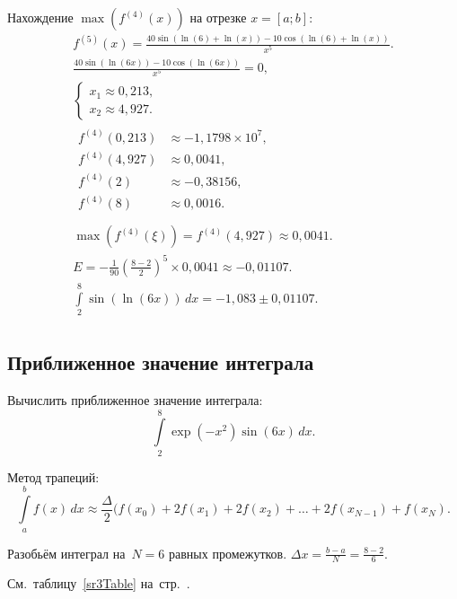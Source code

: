 \documentclass[10pt, a4paper, titlepage, oneside]{article}
\begin{document}
Нахождение $\max(f^{(4)}(x))$ на отрезке $x=[a; b]$:
\begin{gather*}
    f^{(5)}(x) = \frac{40\sin(\ln(6)+\ln(x))-10\cos(\ln(6)+\ln(x))}{x^5} .\\
    \frac{40\sin(\ln(6x))-10\cos(\ln(6x))}{x^5} = 0 ,\\
    \begin{cases}
        x_1\approx0,213 ,\\
        x_2\approx4,927 .
    \end{cases}
    \\
    \begin{aligned}
        f^{(4)}(0,213) &\approx -1,1798\times10^7 ,\\
        f^{(4)}(4,927) &\approx 0,0041 ,\\
        f^{(4)}(2) &\approx -0,38156 ,\\
        f^{(4)}(8) &\approx 0,0016 .\\
    \end{aligned}
    \\
    \max(f^{(4)}(\xi)) = f^{(4)}(4,927) \approx 0,0041 .\\
    E = -\frac{1}{90}\left(\frac{8-2}{2}\right)^5\times0,0041 \approx -0,01107 .\\
    \int\limits_2^{8} \sin(\ln(6x))\,dx = -1,083\pm0,01107 .\\
\end{gather*}


\subsection*{Приближенное значение интеграла}

Вычислить приближенное значение интеграла:
$$\int\limits_2^8 \exp(-x^2)\sin(6x)\,dx .$$

Метод трапеций:
$$\int\limits_a^b f(x) \, dx \approx \frac{\Delta}{2} (f(x_0)+2f(x_1)+2f(x_2)+\dots+2f(x_{N-1})+f(x_N) .$$

Разобьём интеграл на~$N=6$ равных промежутков. $\Delta x=\frac{b-a}{N}=\frac{8-2}{6}$.

См.~таблицу~\ref{sr3Table} на~стр.~\pageref{sr3Table}.
\end{document}
